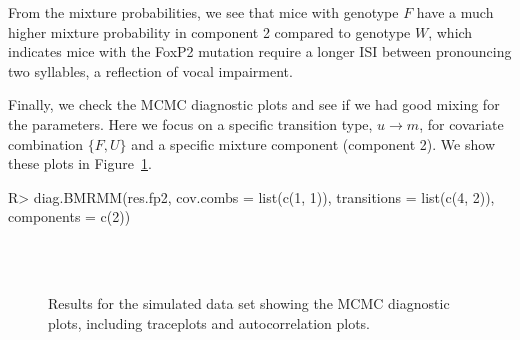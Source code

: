 From the mixture probabilities, we see that mice with genotype $F$ have a much higher mixture probability in component 2 compared to genotype $W$, which indicates mice with the FoxP2 mutation require a longer ISI between pronouncing two syllables, a reflection of vocal impairment. 

Finally, we check the MCMC diagnostic plots and see if we had good mixing for the parameters. 
Here we focus on a specific transition type, $u\rightarrow m$, for covariate combination $\{F,U\}$ and a specific mixture component (component 2).
We show these plots in Figure~\ref{fig:diag}.

\begin{example}
R> diag.BMRMM(res.fp2, cov.combs = list(c(1, 1)), 
              transitions = list(c(4, 2)), components = c(2))
\end{example}



\begin{figure}[!ht]
\centering
{}\\
\\
\caption{Results for the simulated  data set showing the MCMC diagnostic plots, including traceplots and autocorrelation plots. }
\label{fig:diag}
\end{figure}



